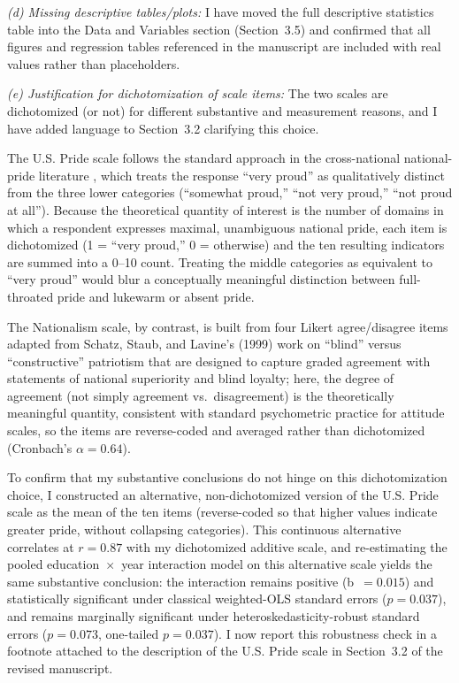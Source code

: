 \documentclass[11pt]{article}
\begin{document}
\textit{(d) Missing descriptive tables/plots:} I have moved the full descriptive statistics table into the Data and Variables section (Section~3.5) and confirmed that all figures and regression tables referenced in the manuscript are included with real values rather than placeholders.

\textit{(e) Justification for dichotomization of scale items:} The two scales are dichotomized (or not) for different substantive and measurement reasons, and I have added language to Section~3.2 clarifying this choice.

The U.S. Pride scale follows the standard approach in the cross-national national-pride literature \citep{smith2006national}, which treats the response ``very proud'' as qualitatively distinct from the three lower categories (``somewhat proud,'' ``not very proud,'' ``not proud at all''). Because the theoretical quantity of interest is the number of domains in which a respondent expresses maximal, unambiguous national pride, each item is dichotomized (1 = ``very proud,'' 0 = otherwise) and the ten resulting indicators are summed into a 0--10 count. Treating the middle categories as equivalent to ``very proud'' would blur a conceptually meaningful distinction between full-throated pride and lukewarm or absent pride.

The Nationalism scale, by contrast, is built from four Likert agree/disagree items adapted from Schatz, Staub, and Lavine's (1999) work on ``blind'' versus ``constructive'' patriotism that are designed to capture graded agreement with statements of national superiority and blind loyalty; here, the degree of agreement (not simply agreement vs.\ disagreement) is the theoretically meaningful quantity, consistent with standard psychometric practice for attitude scales, so the items are reverse-coded and averaged rather than dichotomized (Cronbach's $\alpha = 0.64$).

To confirm that my substantive conclusions do not hinge on this dichotomization choice, I constructed an alternative, non-dichotomized version of the U.S. Pride scale as the mean of the ten items (reverse-coded so that higher values indicate greater pride, without collapsing categories). This continuous alternative correlates at $r = 0.87$ with my dichotomized additive scale, and re-estimating the pooled education~$\times$~year interaction model on this alternative scale yields the same substantive conclusion: the interaction remains positive (b~$=0.015$) and statistically significant under classical weighted-OLS standard errors ($p = 0.037$), and remains marginally significant under heteroskedasticity-robust standard errors ($p = 0.073$, one-tailed $p = 0.037$). I now report this robustness check in a footnote attached to the description of the U.S. Pride scale in Section~3.2 of the revised manuscript.
\end{document}
